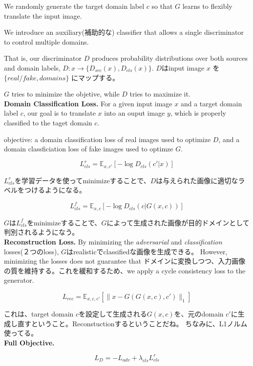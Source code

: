 \documentclass[12pt,fleqn,dvipdfmx]{jarticle}
\begin{document}
    We randomly generate the target domain label $c$ so that $G$ learns to flexibly translate the input image.

    We introduce an auxiliary(補助的な) classifier that allows a single discriminator to control multiple domains.

    That is, our discriminator $D$ produces probability distributions over both sources and domain labels, $D:x\rightarrow \{D_{src}(x), D_{cls}(x)\}$.
    $D$はinput image $x$ を $\{ real/fake, domains \}$ にマップする。

    $G$ tries to minimize the objetive, while $D$ tries to maximize it.
    \\

    \textbf{Domain Classification Loss.} For a given input image $x$ and a target domain label $c$,
    our goal is to translate $x$ into an ouput image $y$, which is properly classified to the taget domain $c$.

    objective: a domain classification loss of real images used to optimize $D$, and a domain classficiation loss of fake images used to optimze $G$.

     $$L^r_{cls}=\mathbb{E}_{x, c'}[-\log{D_{cls}(c'|x)}]$$

    $L^r_{cls}$を学習データを使ってminimizeすることで、$D$は与えられた画像に適切なラベルをつけるようになる。

     $$L^f_{cls}=\mathbb{E}_{x, c}[-\log{D_{cls}(c|G(x, c))}]$$

    $G$は$L^f_{cls}$をminimizeすることで、$G$によって生成された画像が目的ドメインとして判別されるようになう。
    \\

    \textbf{Reconstruction Loss.}
    By minimizing the \textit{adversarial} and \textit{classification} losses(２つのloss), $G$はrealisticでclassifiedな画像を生成できる。
    However, minimizing the losses does not guarantee that ドメインに変換しつつ、入力画像の質を維持する。これを緩和するため、we apply a cycle consistency loss to the generator.

      $$L_{rec}=\mathbb{E}_{x, c, c'} [\| x - G(G(x, c), c') \|_1] $$

    これは、target domain $c$を設定して生成される$G(x, c)$を、元のdomain $c'$に生成し直すということ。Reconstuctionするということだね。
    ちなみに、L1ノルム使ってる。
    \\

    \textbf{Full Objective.}

     $$L_D = -L_{adv} + \lambda_{cls}L^r_{cls}$$
\end{document}
